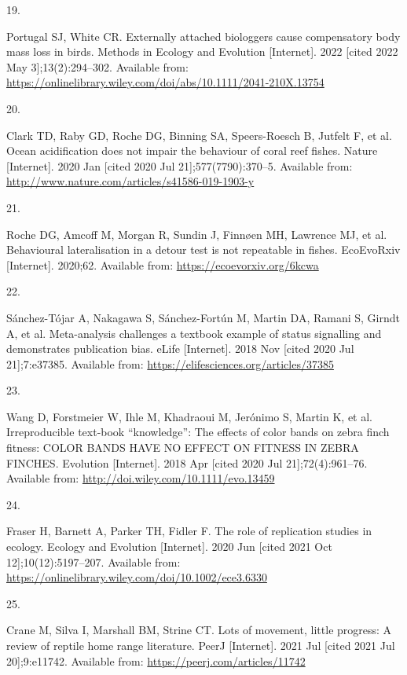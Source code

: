 \documentclass[10pt,a4paper]{article}
\newlength{\cslhangindent}
\newlength{\csllabelwidth}
\newenvironment{CSLReferences}[2] %
{\begin{list}{}{%
	\setlength{\itemindent}{0pt}
	\setlength{\leftmargin}{0pt}
	\setlength{\parsep}{0pt}
	\ifodd #1
	\setlength{\leftmargin}{\cslhangindent}
	\setlength{\itemindent}{-1\cslhangindent}
	\fi
	\setlength{\itemsep}{#2\baselineskip}}}
{\end{list}}
\newcommand{\CSLLeftMargin}[1]{\parbox[t]{\csllabelwidth}{\strut#1\strut}}
\newcommand{\CSLRightInline}[1]{\parbox[t]{\linewidth - \csllabelwidth}{\strut#1\strut}}
\begin{document}
\begin{CSLReferences}{0}{1}
\CSLLeftMargin{19. }%
\CSLRightInline{Portugal SJ, White CR. Externally attached biologgers cause compensatory body mass loss in birds. Methods in Ecology and Evolution {[}Internet{]}. 2022 {[}cited 2022 May 3{]};13(2):294--302. Available from: \url{https://onlinelibrary.wiley.com/doi/abs/10.1111/2041-210X.13754}}

\CSLLeftMargin{20. }%
\CSLRightInline{Clark TD, Raby GD, Roche DG, Binning SA, Speers-Roesch B, Jutfelt F, et al. Ocean acidification does not impair the behaviour of coral reef fishes. Nature {[}Internet{]}. 2020 Jan {[}cited 2020 Jul 21{]};577(7790):370--5. Available from: \url{http://www.nature.com/articles/s41586-019-1903-y}}

\CSLLeftMargin{21. }%
\CSLRightInline{Roche DG, Amcoff M, Morgan R, Sundin J, Finnøen MH, Lawrence MJ, et al. Behavioural lateralisation in a detour test is not repeatable in fishes. EcoEvoRxiv {[}Internet{]}. 2020;62. Available from: \url{https://ecoevorxiv.org/6kcwa}}

\CSLLeftMargin{22. }%
\CSLRightInline{Sánchez-Tójar A, Nakagawa S, Sánchez-Fortún M, Martin DA, Ramani S, Girndt A, et al. Meta-analysis challenges a textbook example of status signalling and demonstrates publication bias. eLife {[}Internet{]}. 2018 Nov {[}cited 2020 Jul 21{]};7:e37385. Available from: \url{https://elifesciences.org/articles/37385}}

\CSLLeftMargin{23. }%
\CSLRightInline{Wang D, Forstmeier W, Ihle M, Khadraoui M, Jerónimo S, Martin K, et al. Irreproducible text-book {``knowledge''}: {The} effects of color bands on zebra finch fitness: {COLOR} {BANDS} {HAVE} {NO} {EFFECT} {ON} {FITNESS} {IN} {ZEBRA} {FINCHES}. Evolution {[}Internet{]}. 2018 Apr {[}cited 2020 Jul 21{]};72(4):961--76. Available from: \url{http://doi.wiley.com/10.1111/evo.13459}}

\CSLLeftMargin{24. }%
\CSLRightInline{Fraser H, Barnett A, Parker TH, Fidler F. The role of replication studies in ecology. Ecology and Evolution {[}Internet{]}. 2020 Jun {[}cited 2021 Oct 12{]};10(12):5197--207. Available from: \url{https://onlinelibrary.wiley.com/doi/10.1002/ece3.6330}}

\CSLLeftMargin{25. }%
\CSLRightInline{Crane M, Silva I, Marshall BM, Strine CT. Lots of movement, little progress: A review of reptile home range literature. PeerJ {[}Internet{]}. 2021 Jul {[}cited 2021 Jul 20{]};9:e11742. Available from: \url{https://peerj.com/articles/11742}}


\end{CSLReferences}
\end{document}
